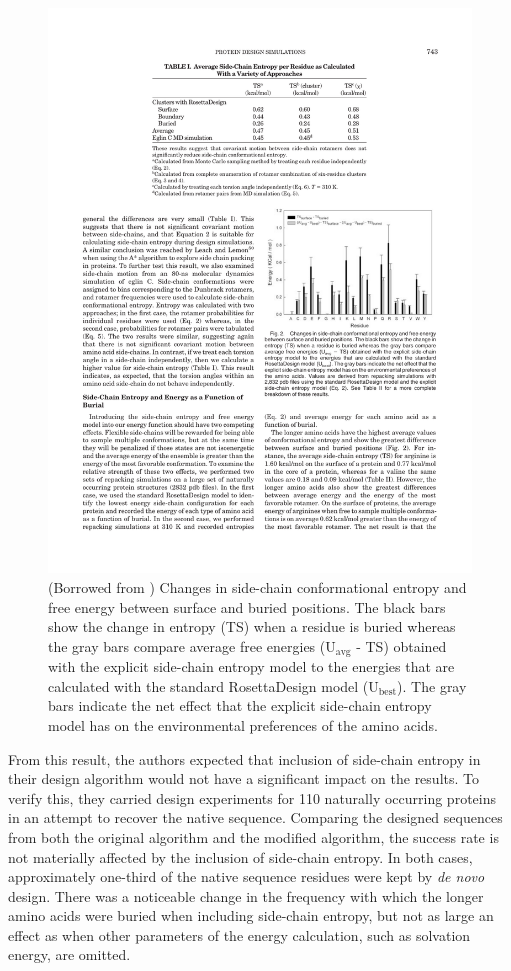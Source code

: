 \begin{figure}[h]
	\center
	\includegraphics{surface_vs_buried}
	\caption{(Borrowed from \cite{Hu:2006p68}) Changes in side-chain conformational entropy and free energy between surface and buried positions. The black bars show the change in entropy (TS) when a residue is buried whereas the gray bars compare average free energies ($\mathrm{U_{avg}}$ - TS) obtained with the explicit side-chain entropy model to the energies that are calculated with the standard RosettaDesign model ($\mathrm{U_{best}}$). The gray bars indicate the net effect that the explicit side-chain entropy model has on the environmental preferences of the amino acids.}
	\label{fig:surface_vs_buried}
\end{figure}

From this result, the authors expected that inclusion of side-chain entropy in their design algorithm would not have a significant impact on the results. To verify this, they carried design experiments for 110 naturally occurring proteins in an attempt to recover the native sequence. Comparing the designed sequences from both the original algorithm and the modified algorithm, the success rate is not materially affected by the inclusion of side-chain entropy. In both cases, approximately one-third of the native sequence residues were kept by \emph{de novo} design. There was a noticeable change in the frequency with which the longer amino acids were buried when including side-chain entropy, but not as large an effect as when other parameters of the energy calculation, such as solvation energy, are omitted.


